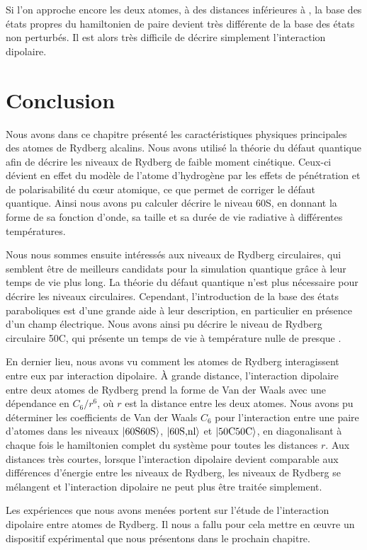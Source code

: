 Si l'on approche encore les deux atomes, à des distances inférieures à , la base des états propres du hamiltonien de paire devient très différente de la base des états non perturbés.
Il est alors très difficile de décrire simplement l'interaction dipolaire.

\section*{Conclusion}
\noindent Nous avons dans ce chapitre présenté les caractéristiques physiques principales des atomes de Rydberg alcalins.
Nous avons utilisé la théorie du défaut quantique afin de décrire les niveaux de Rydberg de faible moment cinétique.
Ceux-ci dévient en effet du modèle de l'atome d'hydrogène par les effets de pénétration et de polarisabilité du c\oe ur atomique, ce que permet de corriger le défaut quantique.
Ainsi nous avons pu calculer décrire le niveau 60S, en donnant la forme de sa fonction d'onde, sa taille et sa durée de vie radiative à différentes températures.

Nous nous sommes ensuite intéressés aux niveaux de Rydberg circulaires, qui semblent être de meilleurs candidats pour la simulation quantique grâce à leur temps de vie plus long.
La théorie du défaut quantique n'est plus nécessaire pour décrire les niveaux circulaires.
Cependant, l'introduction de la base des états paraboliques est d'une grande aide à leur description, en particulier en présence d'un champ électrique.
Nous avons ainsi pu décrire le niveau de Rydberg circulaire 50C, qui présente un temps de vie à température nulle de presque .

En dernier lieu, nous avons vu comment les atomes de Rydberg interagissent entre eux par interaction dipolaire.
\`A grande distance, l'interaction dipolaire entre deux atomes de Rydberg prend la forme de Van der Waals avec une dépendance en $C_6/r^6$, où $r$ est la distance entre les deux atomes.
Nous avons pu déterminer les coefficients de Van der Waals $C_6$ pour l'interaction entre une paire d'atomes dans les niveaux $\ket{\text{60S60S}}$, $\ket{\text{60S,nl}}$ et $\ket{\text{50C50C}}$, en diagonalisant à chaque fois le hamiltonien complet du système pour toutes les distances $r$.
Aux distances très courtes, lorsque l'interaction dipolaire devient comparable aux différences d'énergie entre les niveaux de Rydberg, les niveaux de Rydberg se mélangent et l'interaction dipolaire ne peut plus être traitée simplement.

Les expériences que nous avons menées portent sur l'étude de l'interaction dipolaire entre atomes de Rydberg.
Il nous a fallu pour cela mettre en \oe uvre un dispositif expérimental que nous présentons dans le prochain chapitre.%



